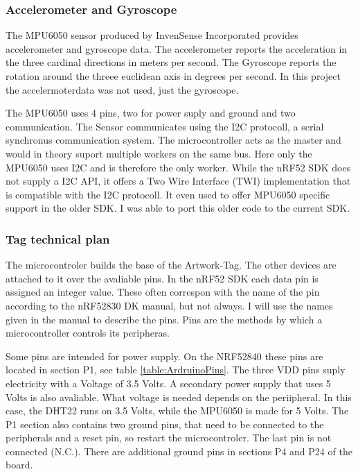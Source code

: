 \subsubsection{Accelerometer and Gyroscope}
The MPU6050 sensor produced by InvenSense Incorporated provides accelerometer and gyroscope data.
The accelerometer reports the acceleration in the three cardinal directions in meters per second.
The Gyroscope reports the rotation around the threee euclidean axis in degrees per second.
In this project the accelermoterdata was not used, just the gyroscope.

The MPU6050 uses 4 pins, two for power suply and ground and two communication.
The Sensor communicates using the I2C protocoll, a serial synchronus communication system.
The microcontroller acts as the master and would in theory suport multiple workers on the same bus. 
Here only the MPU6050 uses I2C and is therefore the only worker.
While the nRF52 SDK does not supply a I2C API, it offers a Two Wire Interface (TWI) implementation that is compatible with the I2C protocoll.
It even used to offer MPU6050 specific support in the older SDK. 
I was able to port this older code to the current SDK.

\subsubsection{Tag technical plan}
The microcontroler builds the base of the Artwork-Tag. 
The other devices are attached to it over the avaliable pins.
In the nRF52 SDK each data pin is assigned an integer value. 
These often correspon with the name of the pin according to the nRF52830 DK manual, but not always.
I will use the names given in the manual to describe the pins.
Pins are the methods by which a microcontroller controls its peripheras.

Some pins are intended for power supply.
On the NRF52840 these pins are located in section P1, see table \ref{table:ArdruinoPins}.
The three VDD pins suply electricity with a Voltage of 3.5 Volts.
A secondary power supply that uses 5 Volts is also avaliable.
What voltage is needed depends on the periipheral.
In this case, the DHT22 runs on 3.5 Volts, while the MPU6050 is made for 5 Volts.
The P1 section also contains two ground pins, that need to be connected to the peripherals and a reset pin, so restart the microcontroler.
The last pin is not connected (N.C.).
There are additional ground pins in sections P4 and P24 of the board.

